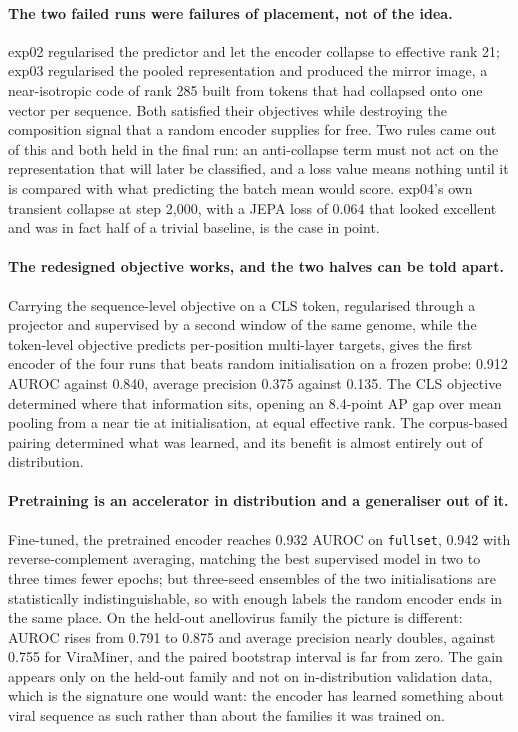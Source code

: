 \documentclass[10pt,twocolumn,a4paper]{article}
\begin{document}
\paragraph{The two failed runs were failures of placement, not of the idea.}
exp02 regularised the predictor and let the encoder collapse to effective rank
21; exp03 regularised the pooled representation and produced the mirror image, a
near-isotropic code of rank 285 built from tokens that had collapsed onto one
vector per sequence. Both satisfied their objectives while destroying the
composition signal that a random encoder supplies for free. Two rules came out of
this and both held in the final run: an anti-collapse term must not act on the
representation that will later be classified, and a loss value means nothing
until it is compared with what predicting the batch mean would score. exp04's own
transient collapse at step 2{,}000, with a JEPA loss of 0.064 that looked
excellent and was in fact half of a trivial baseline, is the case in point.

\paragraph{The redesigned objective works, and the two halves can be told apart.}
Carrying the sequence-level objective on a CLS token, regularised through a
projector and supervised by a second window of the same genome, while the
token-level objective predicts per-position multi-layer targets, gives the first
encoder of the four runs that beats random initialisation on a frozen probe:
0.912 AUROC against 0.840, average precision 0.375 against 0.135. The CLS
objective determined where that information sits, opening an 8.4-point AP gap
over mean pooling from a near tie at initialisation, at equal effective rank.
The corpus-based pairing determined what was learned, and its benefit is almost
entirely out of distribution.

\paragraph{Pretraining is an accelerator in distribution and a generaliser out of it.}
Fine-tuned, the pretrained encoder reaches 0.932 AUROC on \texttt{fullset}, 0.942
with reverse-complement averaging, matching the best supervised model in two to
three times fewer epochs; but three-seed ensembles of the two initialisations are
statistically indistinguishable, so with enough labels the random encoder ends in
the same place. On the held-out anellovirus family the picture is different:
AUROC rises from 0.791 to 0.875 and average precision nearly doubles, against 0.755 for
ViraMiner, and the paired bootstrap interval is far from zero. The gain appears
only on the held-out family and not on in-distribution validation data, which is
the signature one would want: the encoder has learned something about viral
sequence as such rather than about the families it was trained on.
\end{document}
